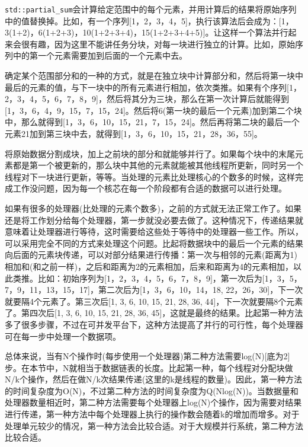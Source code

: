 \texttt{std::partial\_sum}会计算给定范围中的每个元素，并用计算后的结果将原始序列中的值替换掉。比如，有一个序列[1，2，3，4，5]，执行该算法后会成为：[1，3(1+2)，6(1+2+3)，10(1+2+3+4)，15(1+2+3+4+5)]。让这样一个算法并行起来会很有趣，因为这里不能讲任务分块，对每一块进行独立的计算。比如，原始序列中的第一个元素需要加到后面的一个元素中去。

确定某个范围部分和的一种的方式，就是在独立块中计算部分和，然后将第一块中最后的元素的值，与下一块中的所有元素进行相加，依次类推。如果有个序列[1，2，3，4，5，6，7，8，9]，然后将其分为三块，那么在第一次计算后就能得到[{1，3，6}，{4，9，15}，{7，15，24}]。然后将6(第一块的最后一个元素)加到第二个块中，那么就得到[{1，3，6}，{10，15，21}，{7，15，24}]。然后再将第二块的最后一个元素21加到第三块中去，就得到[{1，3，6}，{10，15，21}，{28，36，55}]。

将原始数据分割成块，加上之前块的部分和就能够并行了。如果每个块中的末尾元素都是第一个被更新的，那么块中其他的元素就能被其他线程所更新，同时另一个线程对下一块进行更新，等等。当处理的元素比处理核心的个数多的时候，这样完成工作没问题，因为每一个核芯在每一个阶段都有合适的数据可以进行处理。

如果有很多的处理器(比处理的元素个数多)，之前的方式就无法正常工作了。如果还是将工作划分给每个处理器，第一步就没必要去做了。这种情况下，传递结果就意味着让处理器进行等待，这时需要给这些处于等待中的处理器一些工作。所以，可以采用完全不同的方式来处理这个问题。比起将数据块中的最后一个元素的结果向后面的元素块传递，可以对部分结果进行传播：第一次与相邻的元素(距离为1)相加和(和之前一样)，之后和距离为2的元素相加，后来和距离为4的元素相加，以此类推。比如：初始序列为[1，2，3，4，5，6，7，8，9]，第一次后为[1，3，5，7，9，11，13，15，17]，第二次后为[1，3，6，10，14，18, 22，26，30]，下一次就要隔4个元素了。第三次后[1, 3, 6, 10, 15, 21, 28, 36, 44]，下一次就要隔8个元素了。第四次后[1, 3, 6, 10, 15, 21, 28, 36, 45]，这就是最终的结果。比起第一种方法多了很多步骤，不过在可并发平台下，这种方法提高了并行的可行性，每个处理器可在每一步中处理一个数据项。

总体来说，当有N个操作时(每步使用一个处理器)第二种方法需要log(N)[底为2]步。在本节中，N就相当于数据链表的长度。比起第一种，每个线程对分配块做N/k个操作，然后在做N/k次结果传递(这里的k是线程的数量)。因此，第一种方法的时间复杂度为O(N)，不过第二种方法的时间复杂度为Q(Nlog(N))。当数据量和处理器数量相近时，第二种方法需要每个处理器上log(N)个操作，因为需要对结果进行传递，第一种方法中每个处理器上执行的操作数会随着k的增加而增多。对于处理单元较少的情况，第一种方法会比较合适。对于大规模并行系统，第二种方法比较合适。

